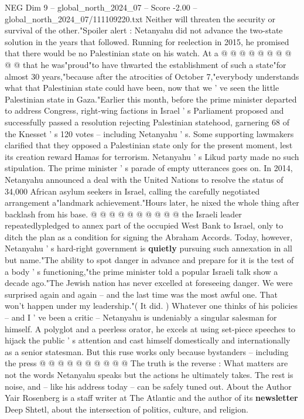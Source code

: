 \begin{textsample}{NEG Dim 9 – global\_north\_2024\_07 – Score -2.00 – global\_north\_2024\_07/111109220.txt}
Neither will threaten the security or survival of the other."Spoiler alert : Netanyahu did not advance the two-state solution in the years that followed.
Running for reelection in 2015, he promised that there would be no Palestinian state on his watch.
At a @ @ @ @ @ @ @ @ @ @ that he was"proud"to have thwarted the establishment of such a state"for almost 30 years,"because after the atrocities of October 7,"everybody understands what that Palestinian state could have been, now that we ' ve seen the little Palestinian state in Gaza."Earlier this month, before the prime minister departed to address Congress, right-wing factions in Israel ' s Parliament proposed and successfully passed a resolution rejecting Palestinian statehood, garnering 68 of the Knesset ' s 120 votes -- including Netanyahu ' s.
Some supporting lawmakers clarified that they opposed a Palestinian state only for the present moment, lest its creation reward Hamas for terrorism.
Netanyahu ' s Likud party made no such stipulation.
The prime minister ' s parade of empty utterances goes on.
In 2014, Netanyahu announced a deal with the United Nations to resolve the status of 34,000 African asylum seekers in Israel, calling the carefully negotiated arrangement a"landmark achievement."Hours later, he nixed the whole thing after backlash from his base. @ @ @ @ @ @ @ @ @ @ the Israeli leader repeatedlypledged to annex part of the occupied West Bank to Israel, only to ditch the plan as a condition for signing the Abraham Accords.
Today, however, Netanyahu ' s hard-right government is \textbf{quietly} pursuing such annexation in all but name."The ability to spot danger in advance and prepare for it is the test of a body ' s functioning,"the prime minister told a popular Israeli talk show a decade ago."The Jewish nation has never excelled at foreseeing danger.
We were surprised again and again -- and the last time was the most awful one.
That won't happen under my leadership."( It did. ) Whatever one thinks of his policies -- and I ' ve been a critic -- Netanyahu is undeniably a singular salesman for himself.
A polyglot and a peerless orator, he excels at using set-piece speeches to hijack the public ' s attention and cast himself domestically and internationally as a senior statesman.
But this ruse works only because bystanders -- including the press @ @ @ @ @ @ @ @ @ @ The truth is the reverse : What matters are not the words Netanyahu speaks but the actions he ultimately takes.
The rest is noise, and -- like his address today -- can be safely tuned out.
About the Author Yair Rosenberg is a staff writer at The Atlantic and the author of its \textbf{newsletter} Deep Shtetl, about the intersection of politics, culture, and religion.

\end{textsample}
